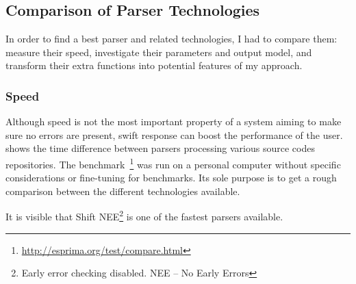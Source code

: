 \subsection{Comparison of Parser Technologies}
In order to find a best parser and related technologies, I had to compare them: measure their speed, investigate their parameters and output model, and transform their extra functions into potential features of my approach.

\subsubsection{Speed} Although speed is not the most important property of a system aiming to make sure no errors are present, swift response can boost the performance of the user.  shows the time difference between parsers processing various source codes repositories. The benchmark~\footnote{\url{http://esprima.org/test/compare.html}} was run on a personal computer without specific considerations or fine-tuning for benchmarks. Its sole purpose is to get a rough comparison between the different technologies available.

It is visible that Shift NEE\footnote{Early error checking disabled. NEE -- No Early Errors} is one of the fastest parsers available.


